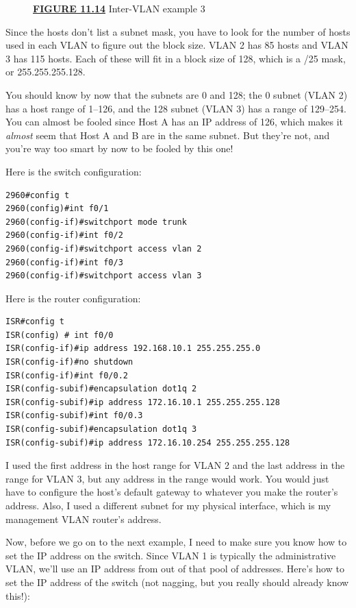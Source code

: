 \begin{figure}
\centering
\caption{{\protect\hyperlink{c11.xhtmlux5cux23figureanchor11-14}{\textbf{FIGURE
11.14}} Inter-VLAN example 3}}
\end{figure}

Since the hosts don't list a subnet mask, you have to look for the
number of hosts used in each VLAN to figure out the block size. VLAN 2
has 85 hosts and VLAN 3 has 115 hosts. Each of these will fit in a block
size of 128, which is a /25 mask, or 255.255.255.128.

You should know by now that the subnets are 0 and 128; the 0 subnet
(VLAN 2) has a host range of 1--126, and the 128 subnet (VLAN 3) has a
range of 129--254. You can almost be fooled since Host A has an IP
address of 126, which makes it \emph{almost} seem that Host A and B are
in the same subnet. But they're not, and you're way too smart by now to
be fooled by this one!

Here is the switch configuration:

\begin{verbatim}
2960#config t
2960(config)#int f0/1
2960(config-if)#switchport mode trunk
2960(config-if)#int f0/2
2960(config-if)#switchport access vlan 2
2960(config-if)#int f0/3
2960(config-if)#switchport access vlan 3
\end{verbatim}

Here is the router configuration:

\begin{verbatim}
ISR#config t
ISR(config) # int f0/0
ISR(config-if)#ip address 192.168.10.1 255.255.255.0
ISR(config-if)#no shutdown
ISR(config-if)#int f0/0.2
ISR(config-subif)#encapsulation dot1q 2
ISR(config-subif)#ip address 172.16.10.1 255.255.255.128
ISR(config-subif)#int f0/0.3
ISR(config-subif)#encapsulation dot1q 3
ISR(config-subif)#ip address 172.16.10.254 255.255.255.128
\end{verbatim}

I used the first address in the host range for VLAN 2 and the last
address in the range for VLAN 3, but any address in the range would
work. You would just have to configure the host's default gateway to
whatever you make the router's address. Also, I used a different subnet
for my physical interface, which is my management VLAN router's address.

Now, before we go on to the next example, I need to make sure you know
how to set the IP address on the switch. Since VLAN 1 is typically the
administrative VLAN, we'll use an IP address from out of that pool of
addresses. Here's how to set the IP address of the switch (not nagging,
but you really should already know this!):


